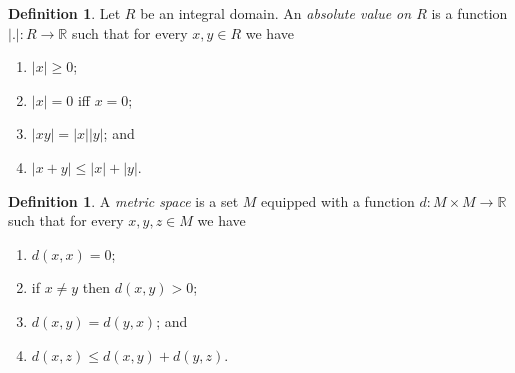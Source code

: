 \documentclass[12pt]{article}
\theoremstyle{definition}
\newtheorem{dfn}[thm]{Definition}
\theoremstyle{remark}
\begin{document}
    
    \begin{dfn}
        Let $R$ be an integral domain. An \emph{absolute value on $R$} is a function $|.|\colon R\to \mathbb{R}$ such that for every $x,y\in R$ we have
        \begin{enumerate}[label=(\alph*)]
            \item $|x|\geq 0$;
            \item $|x|=0$ iff $x=0$;
            \item $|xy|=|x||y|$; and
            \item $|x+y|\leq |x|+|y|$.
        \end{enumerate}
    \end{dfn}

    \begin{dfn}
        A \emph{metric space} is a set $M$ equipped with a function $d\colon M\times M\to \mathbb{R}$ such that for every $x,y,z\in M$ we have
        \begin{enumerate}[label=(\alph*)]
            \item $d(x,x)=0$;
            \item if $x\neq y$ then $d(x,y)>0$;
            \item $d(x,y) = d(y,x)$; and
            \item $d(x,z)\leq d(x,y)+d(y,z)$.
        \end{enumerate}
    \end{dfn}
\end{document}
